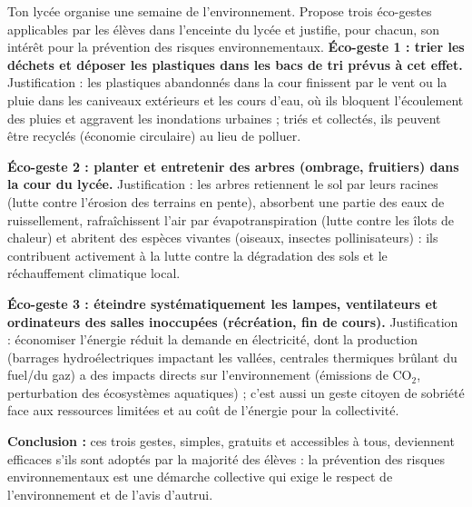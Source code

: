 \documentclass[11pt]{article}
\begin{document}
\begin{exoresolu}
Ton lycée organise une semaine de l'environnement. Propose trois éco-gestes applicables par les élèves dans l'enceinte du lycée et justifie, pour chacun, son intérêt pour la prévention des risques environnementaux.
\tcblower
\textbf{Éco-geste 1 : trier les déchets et déposer les plastiques dans les bacs de tri prévus à cet effet.} Justification : les plastiques abandonnés dans la cour finissent par le vent ou la pluie dans les caniveaux extérieurs et les cours d'eau, où ils bloquent l'écoulement des pluies et aggravent les inondations urbaines ; triés et collectés, ils peuvent être recyclés (économie circulaire) au lieu de polluer.

\textbf{Éco-geste 2 : planter et entretenir des arbres (ombrage, fruitiers) dans la cour du lycée.} Justification : les arbres retiennent le sol par leurs racines (lutte contre l'érosion des terrains en pente), absorbent une partie des eaux de ruissellement, rafraîchissent l'air par évapotranspiration (lutte contre les îlots de chaleur) et abritent des espèces vivantes (oiseaux, insectes pollinisateurs) : ils contribuent activement à la lutte contre la dégradation des sols et le réchauffement climatique local.

\textbf{Éco-geste 3 : éteindre systématiquement les lampes, ventilateurs et ordinateurs des salles inoccupées (récréation, fin de cours).} Justification : économiser l'énergie réduit la demande en électricité, dont la production (barrages hydroélectriques impactant les vallées, centrales thermiques brûlant du fuel/du gaz) a des impacts directs sur l'environnement (émissions de CO$_2$, perturbation des écosystèmes aquatiques) ; c'est aussi un geste citoyen de sobriété face aux ressources limitées et au coût de l'énergie pour la collectivité.

\textbf{Conclusion :} ces trois gestes, simples, gratuits et accessibles à tous, deviennent efficaces s'ils sont adoptés par la majorité des élèves : la prévention des risques environnementaux est une démarche collective qui exige le respect de l'environnement et de l'avis d'autrui.
\end{exoresolu}
\end{document}
